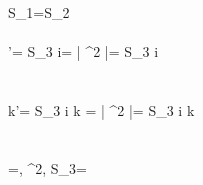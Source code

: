 \\
S_1=S_2
\\\\
{\omega}'= S_3  i\omega = \left | \beta^2  \right |= S_3 \frac {\beta}{\left | \beta \right |} \sqrt {}i\omega
\\
\\
\\
{k}'= S_3  i k = \left | \beta^2  \right |= S_3 \frac {\beta}{\left | \beta \right |}\sqrt {}i k
\\
\\
\\
\beta=, \beta^2, S_3= 
